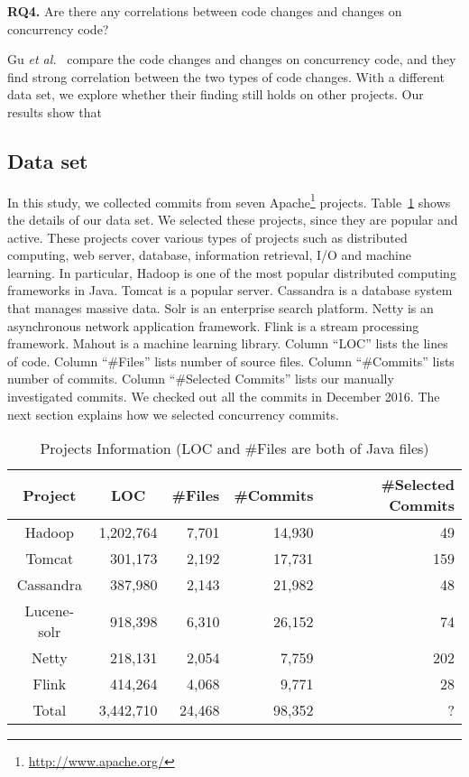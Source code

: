 \textbf{RQ4.} Are there any correlations between code changes and changes on concurrency code?

Gu \emph{et al.}~\cite{conf/sigsoft/GuJSZL15} compare the code changes and changes on concurrency code, and they find strong correlation between the two types of code changes. With a different data set, we explore whether their finding still holds on other projects. Our results show that 

\subsection{Data set}
\label{sec:method:data}
In this study, we collected commits from seven Apache\footnote{\url{http://www.apache.org/}} projects. Table~\ref{table:dataset} shows the details of our data set. We selected these projects, since they are popular and active. These projects cover various types of projects such as distributed computing, web server, database, information retrieval, I/O and machine learning. In particular, Hadoop is one of the most popular distributed computing frameworks in Java. Tomcat is a popular server. Cassandra is a database system that manages massive data. Solr is an enterprise search platform. Netty is an asynchronous network application framework. Flink is a stream processing framework. Mahout is a machine learning library. Column ``LOC'' lists the lines of code. Column ``\#Files'' lists number of source files. Column ``\#Commits'' lists number of commits. Column ``\#Selected Commits'' lists our manually investigated commits. We checked out all the commits in December 2016. The next section explains how we selected concurrency commits.

\begin{table}
	\centering
	\caption{Projects Information (LOC and \#Files are both of Java files)}
    \label{table:dataset}
	\begin{tabular}{|c|r|r|r|r|}\hline
		Project&\multicolumn{1}{|c|}{LOC}&\#Files&\#Commits&\#Selected Commits\\\hline
		Hadoop&1,202,764&7,701&14,930&49\\
		Tomcat&301,173&2,192&17,731&159\\
		Cassandra&387,980&2,143&21,982&48\\
		Lucene-solr&918,398&6,310&26,152&74\\
		Netty&218,131&2,054&7,759&202\\
		Flink&414,264&4,068&9,771&28\\\hline
		Total&3,442,710&24,468&98,352&?\\\hline
	\end{tabular}
\end{table}

